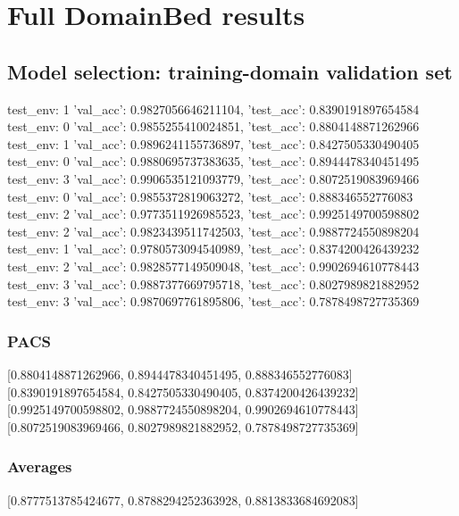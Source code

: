 \documentclass{article}
\begin{document}
\section{Full DomainBed results}

\subsection{Model selection: training-domain validation set}
test_env: 1
{'val_acc': 0.9827056646211104, 'test_acc': 0.8390191897654584}
test_env: 0
{'val_acc': 0.9855255410024851, 'test_acc': 0.8804148871262966}
test_env: 1
{'val_acc': 0.9896241155736897, 'test_acc': 0.8427505330490405}
test_env: 0
{'val_acc': 0.9880695737383635, 'test_acc': 0.8944478340451495}
test_env: 3
{'val_acc': 0.9906535121093779, 'test_acc': 0.8072519083969466}
test_env: 0
{'val_acc': 0.9855372819063272, 'test_acc': 0.888346552776083}
test_env: 2
{'val_acc': 0.9773511926985523, 'test_acc': 0.9925149700598802}
test_env: 2
{'val_acc': 0.9823439511742503, 'test_acc': 0.9887724550898204}
test_env: 1
{'val_acc': 0.9780573094540989, 'test_acc': 0.8374200426439232}
test_env: 2
{'val_acc': 0.9828577149509048, 'test_acc': 0.9902694610778443}
test_env: 3
{'val_acc': 0.9887377669795718, 'test_acc': 0.8027989821882952}
test_env: 3
{'val_acc': 0.9870697761895806, 'test_acc': 0.7878498727735369}

\subsubsection{PACS}
[0.8804148871262966, 0.8944478340451495, 0.888346552776083]
[0.8390191897654584, 0.8427505330490405, 0.8374200426439232]
[0.9925149700598802, 0.9887724550898204, 0.9902694610778443]
[0.8072519083969466, 0.8027989821882952, 0.7878498727735369]

\begin{center}
\end{center}

\subsubsection{Averages}
[0.8777513785424677, 0.8788294252363928, 0.8813833684692083]

\begin{center}
\end{center}
\end{document}
